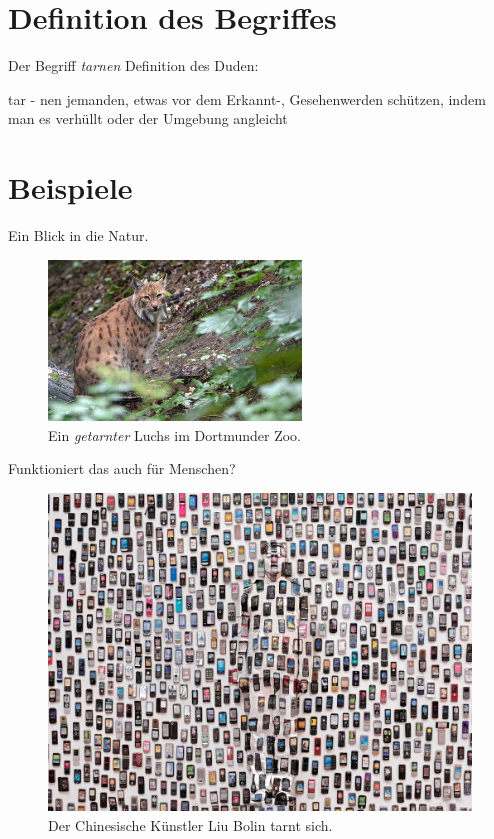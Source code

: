 \section{Definition des Begriffes}

\begin{frame}{Der Begriff \textit{tarnen}}
  Definition des Duden:
  \begin{block}{{\centering tar - nen}}
    jemanden, etwas vor dem Erkannt-, Gesehenwerden sch\"utzen,
    indem man es verh\"ullt oder der Umgebung angleicht
  \end{block}
\end{frame}

\section{Beispiele}
\begin{frame}{Ein Blick in die Natur.}
  \begin{figure}
    \centering
    \caption{Ein \textit{getarnter} Luchs im Dortmunder Zoo.}
    \includegraphics[width=0.6\textwidth]{images/luchs.jpeg}
  \end{figure}
\end{frame}

\begin{frame}{Funktioniert das auch f\"ur Menschen?}
  \begin{figure}
    \centering
    \caption{Der Chinesische K\"unstler Liu Bolin tarnt sich. \cite{humanhide}}
    \includegraphics[height=0.8\textheight]{images/liubolin.jpg}
  \end{figure}
\end{frame}

